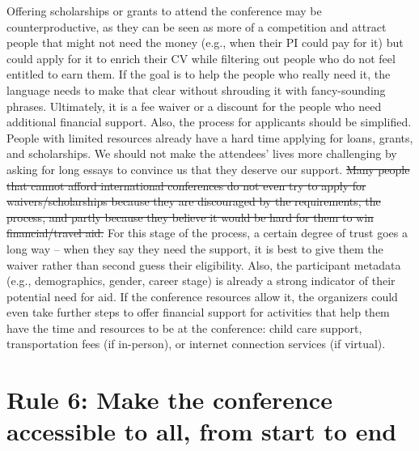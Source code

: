 \documentclass[10pt,letterpaper]{article}
\begin{document}
Offering scholarships or grants to attend the conference may be counterproductive, as they can be seen as more of a competition and attract people that might not need the money (e.g., when their PI could pay for it) but could apply for it to enrich their CV while filtering out people who do not feel entitled to earn them. If the goal is to help the people who really need it, the language needs to make that clear without shrouding it with fancy-sounding phrases. Ultimately, it is a fee waiver or a discount for the people who need additional financial support. Also, the process for applicants should be simplified. People with limited resources already have a hard time applying for loans, grants, and scholarships. We should not make the attendees' lives more challenging by asking for long essays to convince us that they deserve our support. \st{Many people that cannot afford international conferences do not even try to apply for waivers/scholarships because they are discouraged by the requirements, the process, and partly because they believe it would be hard for them to win financial/travel aid.} For this stage of the process, a certain degree of trust goes a long way -- when they say they need the support, it is best to give them the waiver rather than second guess their eligibility. Also, the participant metadata (e.g., demographics, gender, career stage) is already a strong indicator of their potential need for aid.
If the conference resources allow it, the organizers could even take further steps to offer financial support for activities that help them have the time and resources to be at the conference: child care support, transportation fees (if in-person), or internet connection services (if virtual). 

\section*{Rule 6: Make the conference accessible to all, from start to end}
\end{document}
